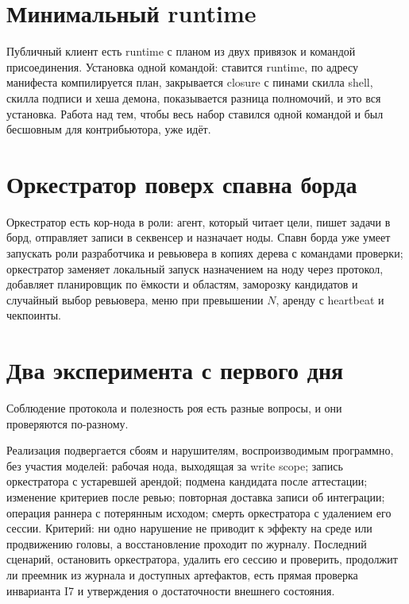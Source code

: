 \section{Минимальный runtime}

Публичный клиент есть runtime с планом из двух привязок и командой присоединения. Установка одной командой: ставится runtime, по адресу манифеста компилируется план, закрывается closure с пинами скилла shell, скилла подписи и хеша демона, показывается разница полномочий, и это вся установка. Работа над тем, чтобы весь набор ставился одной командой и был бесшовным для контрибьютора, уже идёт.

\section{Оркестратор поверх спавна борда}

Оркестратор есть кор-нода в роли: агент, который читает цели, пишет задачи в борд, отправляет записи в секвенсер и назначает ноды. Спавн борда уже умеет запускать роли разработчика и ревьювера в копиях дерева с командами проверки; оркестратор заменяет локальный запуск назначением на ноду через протокол, добавляет планировщик по ёмкости и областям, заморозку кандидатов и случайный выбор ревьювера, меню при превышении $N$, аренду с heartbeat и чекпоинты.

\section{Два эксперимента с первого дня}

Соблюдение протокола и полезность роя есть разные вопросы, и они проверяются по-разному.

 Реализация подвергается сбоям и нарушителям, воспроизводимым программно, без участия моделей: рабочая нода, выходящая за write scope; запись оркестратора с устаревшей арендой; подмена кандидата после аттестации; изменение критериев после ревью; повторная доставка записи об интеграции; операция раннера с потерянным исходом; смерть оркестратора с удалением его сессии. Критерий: ни одно нарушение не приводит к эффекту на среде или продвижению головы, а восстановление проходит по журналу. Последний сценарий, остановить оркестратора, удалить его сессию и проверить, продолжит ли преемник из журнала и доступных артефактов, есть прямая проверка инварианта I7 и утверждения о достаточности внешнего состояния.


